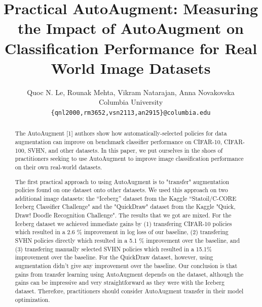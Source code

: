 \documentclass[10pt,twocolumn,letterpaper]{article}
\begin{document}
\title{Practical AutoAugment: Measuring the Impact of AutoAugment on Classification Performance for Real World Image Datasets}

\author{Quoc N. Le, Rounak Mehta, Vikram Natarajan, Anna Novakovska\\
Columbia University\\
{\tt\small \{qnl2000,rm3652,vsn2113,an2915\}@columbia.edu}
\\
}

\maketitle

\begin{abstract}
The AutoAugment [1] authors show how automatically-selected policies for data augmentation can improve on benchmark classifier performance on CIFAR-10, CIFAR-100, SVHN, and other datasets.  In this paper, we put ourselves in the shoes of practitioners seeking to use AutoAugment to improve image classification performance on their own real-world datasets.

The first practical approach to using AutoAugment is to "transfer" augmentation policies found on one dataset onto other datasets. We used this approach on two additional image datasets: the “Iceberg” dataset from the Kaggle “Statoil/C-CORE Iceberg Classifier Challenge" and the "QuickDraw" dataset from the Kaggle "Quick, Draw! Doodle Recognition Challenge". The results that we got are mixed. For the Iceberg dataset we achieved immediate gains by (1) transfering CIFAR-10 policies which resulted in a 2.6 \% improvement in log loss of our baseline, (2) transfering SVHN policies directly which resulted in a 5.1 \% improvement over the baseline, and (3) transfering manually selected SVHN policies which resulted in a 15.1\% improvement over the baseline. For the QuickDraw dataset, however, using augmentation didn't give any improvement over the baseline. Our conclusion is that gains from transfer learning using AutoAugment depends on the dataset, although the gains can be impressive and very straightforward as they were with the Iceberg dataset.  Therefore, practitioners should consider AutoAugment transfer in their model optimization.


\end{abstract}
\end{document}
